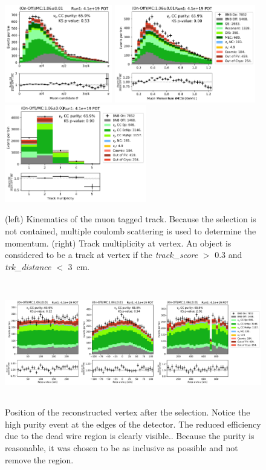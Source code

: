 \begin{figure}[H]
    \centering
    \includegraphics[height=4.25cm]{NuMuCCsel/Images/run1/numu_theta_run1.pdf}
    \includegraphics[height=4.25cm]{NuMuCCsel/Images/run1/numu_mcsmom_run1.pdf} \hspace{1mm}
    \includegraphics[height=4.25cm]{NuMuCCsel/Images/run1/numu_vtxntrack_cat_run1.pdf}
    \caption{(left) Kinematics of the muon tagged track. Because the selection is not contained, multiple coulomb scattering is used to determine the momentum. (right) Track multiplicity at vertex. An object is considered to be a track at vertex if the \textit{track\_score} $>$ 0.3 and \textit{trk\_distance} $<$ \SI{3}{\cm}.}
    \label{fig:numu:mcs}
\end{figure}

\begin{figure}[H]
    \centering
    \includegraphics[height=5.35cm]{NuMuCCsel/Images/run1/numu_recovtx_run1.pdf}
    \caption{Position of the reconstructed vertex after the selection. Notice the high purity event at the edges of the detector. The reduced efficiency due to the dead wire region is clearly visible.. Because the purity is reasonable, it was chosen to be as inclusive as possible and not remove the region.}
    \label{fig:numu:vtx}
\end{figure}

